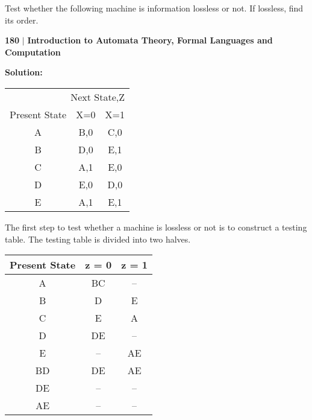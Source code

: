 \documentclass[a4]{article}
\begin{document}
\vspace*{1cm}
 \hspace*{0.2cm} Test whether the following machine is information lossless or not. If lossless, find its order.

\newpage
\begin{flushleft}
    \textbf{180}\hspace*{0.1cm} \textbf{$|$} \hspace*{0.1cm} {\tiny \textbf{Introduction to Automata Theory, Formal Languages and Computation}}
  \end{flushleft}


\vspace*{0.1cm}

\large{\textbf{Solution:}}


\begin{center}
\begin{tabular}{ccc}
\hline

\hline

\hline

\hline
  \multicolumn{3}{r}{{Next State,Z}}\\
 \cline{2-3}
{Present State} & {X=0} & {X=1}\\
\hline
 A & B,0 & C,0 \\
 B & D,0 & E,1 \\
 C & A,1 & E,0 \\
 D & E,0 & D,0 \\
 E & A,1 & E,1 \\
\hline

\hline

\hline

\hline
\end{tabular}
\end{center}


The first step to test whether a machine is lossless or not is to construct a testing table. The testing table is divided into two halves.


\begin{center}
  \begin{tabular}{ccc}
\hline

\hline

\hline

\hline
Present State & z = 0 & z = 1\\
\hline
 A &     BC    &     --      \\
 B &     D     &     E      \\
 C &     E     &     A      \\
 D &     DE    &     --      \\
 E &     --    &     AE      \\
\hline
BD &   DE      &     AE      \\
DE &   --      &     --      \\
AE &   --      &     --      \\
\hline

\hline

\hline

\hline

  \end{tabular}
\end{center}
\end{document}
